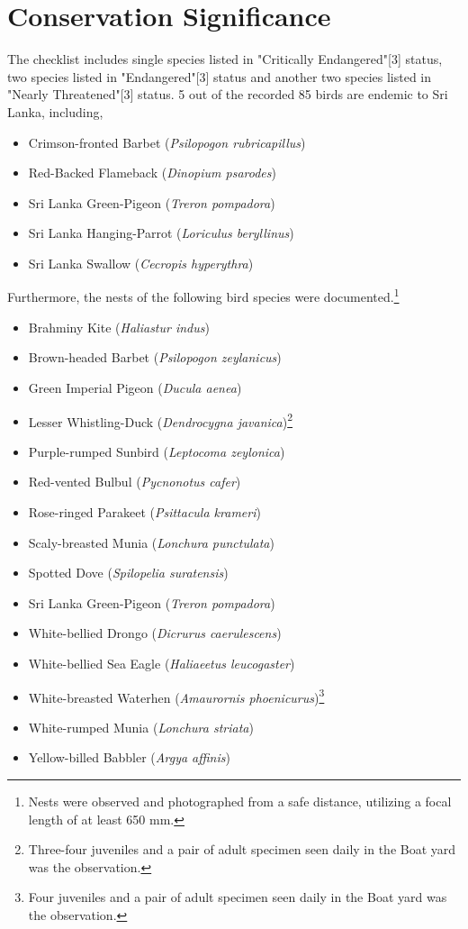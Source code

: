 \section{Conservation Significance}
The checklist includes single species listed in "Critically Endangered"[3] status, two species listed in "Endangered"[3] status  and another two species listed in "Nearly Threatened"[3] status. 5 out of the recorded 85 birds are endemic to Sri Lanka, including,
\begin{itemize}
\item Crimson-fronted Barbet (\textit{Psilopogon rubricapillus})
\item Red{-}Backed Flameback (\textit{Dinopium psarodes})
\item Sri Lanka Green-Pigeon (\textit{Treron pompadora})
 \item Sri Lanka Hanging-Parrot (\textit{Loriculus beryllinus})
   \item Sri Lanka Swallow (\textit{Cecropis hyperythra})
\end{itemize}
Furthermore, the nests of the following bird species were documented.\footnote{Nests were observed and photographed from a safe distance, utilizing a focal length of at least 650 mm.}
\begin{itemize}
\item Brahminy Kite (\textit{Haliastur indus})
\item Brown-headed Barbet (\textit{Psilopogon zeylanicus})
\item Green Imperial Pigeon (\textit{Ducula aenea})
\item Lesser Whistling{-}Duck (\textit{Dendrocygna javanica})\footnote{Three-four juveniles and a pair of adult specimen seen daily in the Boat yard was the observation.}
\item Purple-rumped Sunbird (\textit{Leptocoma zeylonica})
\item Red-vented Bulbul (\textit{Pycnonotus cafer})
\item Rose-ringed Parakeet (\textit{Psittacula krameri})
\item Scaly-breasted Munia (\textit{Lonchura punctulata})
\item Spotted Dove (\textit{Spilopelia suratensis})
\item Sri Lanka Green-Pigeon (\textit{Treron pompadora})
\item White-bellied Drongo (\textit{Dicrurus caerulescens})
\item White-bellied Sea Eagle (\textit{Haliaeetus leucogaster})
\item White-breasted Waterhen (\textit{Amaurornis phoenicurus})\footnote{Four juveniles and a pair of adult specimen seen daily in the Boat yard was the observation.}
\item White-rumped Munia (\textit{Lonchura striata})
\item Yellow-billed Babbler (\textit{Argya affinis})
\end{itemize}
